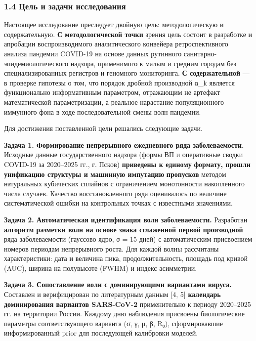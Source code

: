 \documentclass[12pt]{article}
\begin{document}
\subsubsection{1.4 Цель и задачи
исследования}\label{ux446ux435ux43bux44c-ux438-ux437ux430ux434ux430ux447ux438-ux438ux441ux441ux43bux435ux434ux43eux432ux430ux43dux438ux44f}

Настоящее исследование преследует двойную цель: методологическую и
содержательную. \textbf{С методологической точки} зрения цель состоит в
разработке и апробации воспроизводимого аналитического конвейера
ретроспективного анализа пандемии COVID-19 на основе данных рутинного
санитарно-эпидемиологического надзора, применимого к малым и средним
городам без специализированных регистров и геномного мониторинга.
\textbf{С содержательной} --- в проверке гипотезы о том, что порядок
дробной производной α\_k является функционально информативным
параметром, отражающим не артефакт математической параметризации, а
реальное нарастание популяционного иммунного фона в ходе
последовательной смены волн пандемии.

Для достижения поставленной цели решались следующие задачи.

\textbf{Задача 1. Формирование непрерывного ежедневного ряда
заболеваемости.} Исходные данные государственного надзора (формы ВП и
оперативные сводки COVID-19 за 2020--2025 гг., г. Псков)
\textbf{приведены к единому} \textbf{формату, прошли унификацию
структуры и машинную импутацию} \textbf{пропусков} методом натуральных
кубических сплайнов с ограничением монотонности накопленного числа
случаев. Качество восстановленного ряда оценивалось по величине
систематической ошибки на контрольных точках с известными значениями.

\textbf{Задача 2. Автоматическая идентификация волн заболеваемости.}
Разработан \textbf{алгоритм разметки волн на основе знака сглаженной
первой} \textbf{производной} ряда заболеваемости (гауссово ядро, σ = 15
дней) с автоматическим присвоением номеров периодам непрерывного роста.
Для каждой волны рассчитаны характеристики: дата и величина пика,
продолжительность, площадь под кривой (AUC), ширина на полувысоте (FWHM)
и индекс асимметрии.

\textbf{Задача 3. Сопоставление волн с доминирующими вариантами вируса.}
Составлен и верифицирован по литературным данным {[}4, 5{]}
\textbf{календарь} \textbf{доминирования вариантов SARS-CoV-2}
применительно к периоду 2020--2025 гг. на территории России. Каждому дню
наблюдения присвоены биологические параметры соответствующего варианта
(σ, γ, μ, β, R₀), сформировавшие информированный prior для последующей
калибровки моделей.
\end{document}
